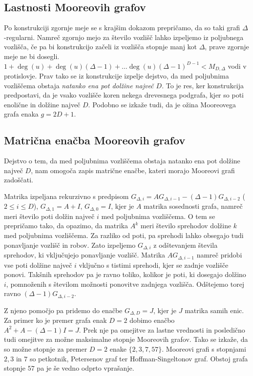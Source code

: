 \documentclass{fmfkpb}
\begin{document}
\subsection{Lastnosti Mooreovih grafov}
Po konstrukciji zgornje meje se s krajšim dokazom prepričamo, da 
so taki grafi $\Delta$-regularni. Namreč zgornjo mejo za 
število vozlišč lahko izpeljemo iz poljubnega vozlišča, če pa 
bi konstrukcijo začeli iz vozlišča stopnje manj kot $\Delta$, 
prave zgornje meje ne bi dosegli. $
    1 + \deg(u) + \deg(u) (\Delta -1) + \ldots \deg(u) (\Delta -1)^{D - 1}
    < M_{D, \Delta}$ vodi v protislovje. 
\newline 
Prav tako se iz konstrukcije izpelje dejstvo, da 
med poljubnima vozliščema obstaja \emph{natanko ena pot
 dolžine največ $D$}.
To je res, ker konstrukcija predpostavi, da je vsako 
vozlišče koren nekega drevesnega podgrafa, kjer so poti enolične 
in dolžine največ $D$.
\newline 
Podobno se izkaže tudi, da je ožina Mooreovega grafa enaka 
$g=2D + 1$.

\subsection{Matrična enačba Mooreovih grafov}
Dejstvo o tem, da med poljubnima vozliščema obstaja natanko ena pot 
dolžine največ $D$, nam omogoča zapis matrične enačbe, kateri 
morajo Mooreovi grafi zadoščati. 

Matrika izpeljana rekurzivno s predpisom 
$G_{\Delta, i} = A G_{\Delta, i - 1} - (\Delta - 1) G_{\Delta, i - 2}$
($2 \le i \le D$),
$G_{\Delta, 1} = A + I$, $G_{\Delta, 0} = I$, kjer je $A$ matrika sosednosti
grafa, namreč meri število poti dolžin največ $i$ med poljubnima
vozliščema. 
O tem se prepričamo tako, da opazimo, da matrika $A^k$ meri število sprehodov dolžine 
$k$ med poljubnima vozliščema. Za razliko od poti, pa sprehodi lahko 
obsegajo tudi ponavljanje vozlišč in robov. Zato izpeljemo $G_{\Delta, i}$ z odštevanjem 
števila sprehodov, ki vključujejo ponavljanje vozlišč. Matrika $A G_{\Delta, i - 1}$ namreč
pridobi vse poti dolžine največ $i$ vključno s tistimi sprehodi, kjer se  
zadnje vozlišče ponovi. Takšnih sprehodov pa je ravno toliko, kolikor je poti, 
ki dosegajo dolžino $i$, pomnoženih s številom možnosti ponovitve zadnjega vozlišča. Odštejemo 
torej ravno $(\Delta - 1) G_{\Delta, i - 2}$.

Z njeno pomočjo pa pridemo do enačbe $G_{\Delta, D} = J$, 
kjer je $J$ matrika samih enic.
\newline 
Za primer ko je premer grafa enak $D=2$ dobimo enačbo 
$A^2 + A - (\Delta - 1) I = J$. Prek nje pa omejitve za 
lastne vrednosti in posledično tudi 
omejitve za možne maksimalne stopnje Mooreovih grafov.
Tako se izkaže, da so možne stopnje za premer $D=2$ enake 
$\{2, 3, 7, 57\}$. 
\newline 
Mooreovi grafi s stopnjami $2, 3$ in $7$ so petkotnik, Petersenov graf
ter Hoffman-Singeltonov graf. Obstoj grafa stopnje $57$ 
pa je še vedno odprto vprašanje.
\end{document}
